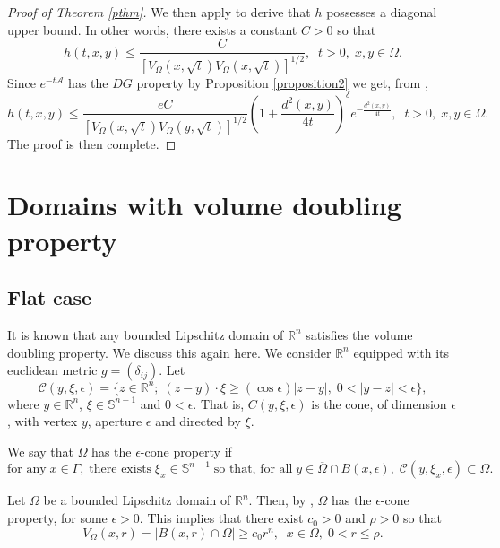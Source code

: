 \documentclass[10pt]{amsart}
\theoremstyle{definition}
\begin{document}
\begin{proof}[Proof of Theorem \ref{pthm}]
\smallskip
We then apply \cite[Theorem 1.2.1]{BCS} to derive that $h$ possesses a diagonal upper bound. In other words, there exists a constant $C>0$ so that
\begin{equation}\label{dub}
h(t,x,y)\leq \frac{C}{\left[V_\Omega (x,\sqrt{t})V_\Omega (x,\sqrt{t})\right]^{1/2}},\;\; t>0,\; x, y\in \Omega .
\end{equation}
Since $e^{-t\mathcal{A}}$ has the $DG$ property by Proposition \ref{proposition2} we get, from \cite[Corollary 5.4, page 524]{CS},
\[
h(t,x,y)\leq \frac{eC}{\left[V_\Omega (x,\sqrt{t})V_\Omega (y,\sqrt{t})\right]^{1/2}}\left( 1+\frac{d^2(x,y)}{4t}\right)^{\delta}e^{-\frac{d^2(x,y)}{4t}},\;\; t>0,\; x,y\in \Omega .
\]
The proof is then complete.
\end{proof}

\section{Domains with volume doubling property}\label{sec3}

\subsection*{Flat case}  It is known that any bounded Lipschitz domain of $\mathbb{R}^n$ satisfies the volume doubling property. 
We discuss this again here. We consider $\mathbb{R}^n$ equipped with its euclidean metric $g=(\delta_{ij})$. Let
\[
\mathscr{C}(y,\xi ,\epsilon )=\{ z\in \mathbb{R}^n;\; (z-y)\cdot \xi \geq (\cos \epsilon )|z-y|,\; 0<|y-z|<\epsilon \},
\]
where $y\in\mathbb{R}^n$, $\xi \in \mathbb{S}^{n-1}$ and $0<\epsilon $. That is, $C(y,\xi ,\epsilon)$  is the cone, of dimension $\epsilon$,  with vertex $y$, aperture $\epsilon$ and directed by $\xi$.

\smallskip
We say that $\Omega$ has the $\epsilon$-cone property if
\[
\textrm{for any}\; x\in \Gamma ,\; \textrm{there exists}\; \xi _x\in \mathbb{S}^{n-1}\; \textrm{so that, for all}\; y\in \overline{\Omega}\cap B(x,\epsilon),\; \mathscr{C}(y,\xi _x,\epsilon )\subset \Omega .
\]

Let $\Omega $ be a bounded Lipschitz domain of $\mathbb{R}^n$. Then, by \cite[Theorem 2.4.7, page 53]{HP}, $\Omega$ has the $\epsilon$-cone property, for some $\epsilon >0$. This implies that there exist $c_0>0$ and $\rho >0$ so that
\begin{equation}\label{Ex1}
V_\Omega (x,r)=|B(x,r)\cap \Omega |\ge c_0r^n,\;\; x\in \Omega ,\; 0<r\le \rho .
\end{equation}
\end{document}
